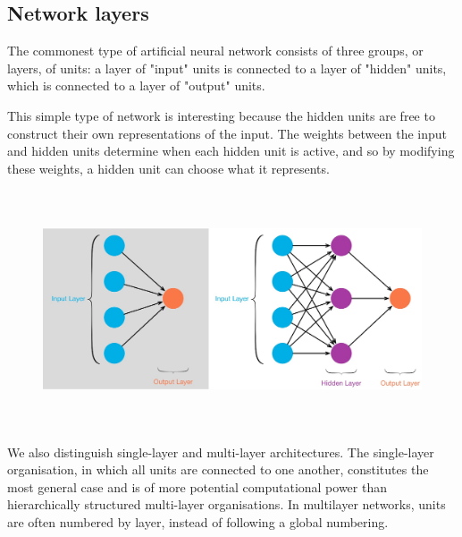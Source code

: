 \documentclass[12pt,times,a4paper]{report}
\begin{document}
{{\begin{normalsize}
\subsection{Network layers}
\par
The commonest type of artificial neural network consists of three groups, or layers, of units: a
layer of "input" units is connected to a layer of "hidden" units, which is connected to a layer of
"output" units.
\par
This simple type of network is interesting because the hidden units are free to construct their own
representations of the input. The weights between the input and hidden units determine when
each hidden unit is active, and so by modifying these weights, a hidden unit can choose what it
represents.
\begin{figure}[H]
\includegraphics[width=15cm,height=7cm,center]{slvsml.jpeg}
\caption{}
\end{figure}
\par
We also distinguish single-layer and multi-layer architectures. The single-layer organisation, in
which all units are connected to one another, constitutes the most general case and is of more
potential computational power than hierarchically structured multi-layer organisations. In multilayer networks, units are often numbered by layer, instead of following a global numbering.

\newpage

\end{normalsize}}}
\end{document}
